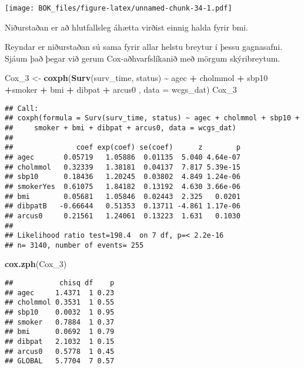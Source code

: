 \documentclass[
]{book}
\newenvironment{Shaded}{\begin{snugshade}}{\end{snugshade}}
\newcommand{\DataTypeTok}[1]{\textcolor[rgb]{0.13,0.29,0.53}{#1}}
\newcommand{\DecValTok}[1]{\textcolor[rgb]{0.00,0.00,0.81}{#1}}
\newcommand{\KeywordTok}[1]{\textcolor[rgb]{0.13,0.29,0.53}{\textbf{#1}}}
\newcommand{\NormalTok}[1]{#1}
\newcommand{\OperatorTok}[1]{\textcolor[rgb]{0.81,0.36,0.00}{\textbf{#1}}}
\newcommand{\StringTok}[1]{\textcolor[rgb]{0.31,0.60,0.02}{#1}}
\begin{document}
\texttt{[image: BOK\_files/figure-latex/unnamed-chunk-34-1.pdf]}

Niðurstaðan er að hlutfallsleg áhætta virðist einnig halda fyrir bmi.

Reyndar er niðurstaðan sú sama fyrir allar helstu breytur í þessu gagnasafni. Sjáum það þegar við gerum Cox-aðhvarfslíkanið með mörgum skýribreytum.

\begin{Shaded}
\begin{Highlighting}[]
\NormalTok{Cox\_}\DecValTok{3}\NormalTok{ <{-}}\StringTok{ }\KeywordTok{coxph}\NormalTok{(}\KeywordTok{Surv}\NormalTok{(surv\_time, status) }\OperatorTok{\textasciitilde{}}\StringTok{  }\NormalTok{agec }\OperatorTok{+}\StringTok{ }\NormalTok{cholmmol }\OperatorTok{+}\StringTok{ }\NormalTok{sbp10 }\OperatorTok{+}\NormalTok{smoker }\OperatorTok{+}\StringTok{ }\NormalTok{bmi  }\OperatorTok{+}\StringTok{ }\NormalTok{dibpat }\OperatorTok{+}\StringTok{ }\NormalTok{arcus0  , }\DataTypeTok{data =}\NormalTok{ wcgs\_dat)}
\NormalTok{Cox\_}\DecValTok{3}
\end{Highlighting}
\end{Shaded}

\begin{verbatim}
## Call:
## coxph(formula = Surv(surv_time, status) ~ agec + cholmmol + sbp10 + 
##     smoker + bmi + dibpat + arcus0, data = wcgs_dat)
## 
##               coef exp(coef) se(coef)      z        p
## agec       0.05719   1.05886  0.01135  5.040 4.64e-07
## cholmmol   0.32339   1.38181  0.04137  7.817 5.39e-15
## sbp10      0.18436   1.20245  0.03802  4.849 1.24e-06
## smokerYes  0.61075   1.84182  0.13192  4.630 3.66e-06
## bmi        0.05681   1.05846  0.02443  2.325   0.0201
## dibpatB   -0.66644   0.51353  0.13711 -4.861 1.17e-06
## arcus0     0.21561   1.24061  0.13223  1.631   0.1030
## 
## Likelihood ratio test=198.4  on 7 df, p=< 2.2e-16
## n= 3140, number of events= 255
\end{verbatim}

\begin{Shaded}
\begin{Highlighting}[]
\KeywordTok{cox.zph}\NormalTok{(Cox\_}\DecValTok{3}\NormalTok{)}
\end{Highlighting}
\end{Shaded}

\begin{verbatim}
##           chisq df    p
## agec     1.4371  1 0.23
## cholmmol 0.3531  1 0.55
## sbp10    0.0032  1 0.95
## smoker   0.7884  1 0.37
## bmi      0.0692  1 0.79
## dibpat   2.1032  1 0.15
## arcus0   0.5778  1 0.45
## GLOBAL   5.7704  7 0.57
\end{verbatim}
\end{document}

